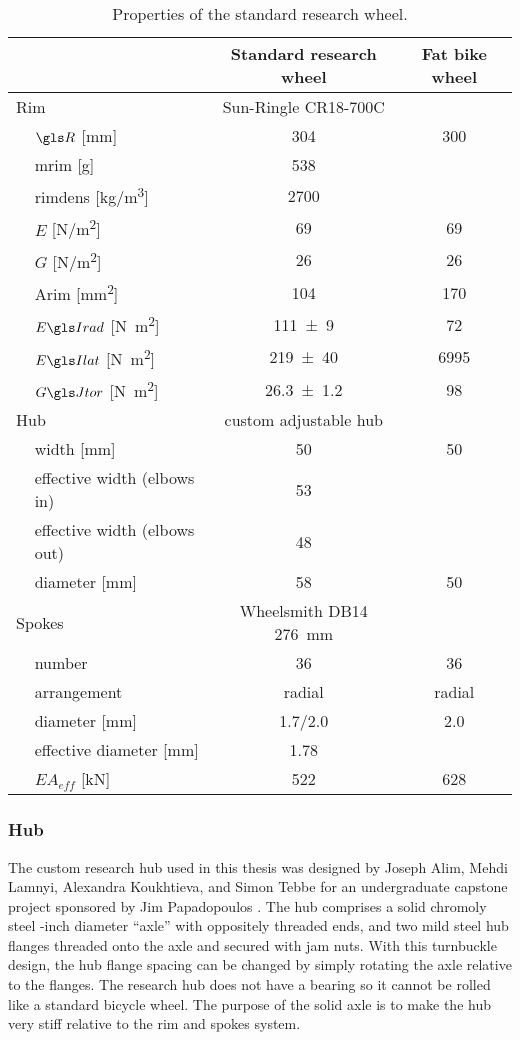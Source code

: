 \documentclass[../../thesis.tex]{subfiles}
\begin{document}
\begin{table}
\caption{Properties of the standard research wheel.}
\label{tab:standard_wheels}
\begin{tabular}{llcc}
\hline
&& \textbf{Standard research wheel} & \textbf{Fat bike wheel}\\
\hline
\multicolumn{2}{l}{Rim}& Sun-Ringle CR18-700C\\
\,& $\R$ [\si{mm}]         & \num{304} & 300\\
\,& \gls{mrim} [\si{g}]    & \num{538}\\
\,& \gls{rimdens} [\si{kg/m^3}] & \num{2700}\\
\,& $E$ [\si{N/m^2}]       & \num{69}        & \num{69}\\
\,& $G$ [\si{N/m^2}]       & \num{26}        & \num{26}\\
\,& \gls{Arim} [\si{mm^2}] & \num{104}       & \num{170}\\
\,& $\EIr$ [\si{N.m^2}]    & \num{111+-9}    & \num{72}\\
\,& $\EIl$ [\si{N.m^2}]    & \num{219+-40}   & \num{6995}\\
\,& $\GJ$   [\si{N.m^2}]   & \num{26.3+-1.2} & \num{98}\\
\multicolumn{2}{l}{Hub} & custom adjustable hub\\
\,& width [\si{mm}]              & 50 & 50\\
\,& effective width (elbows in)  & 53\\
\,& effective width (elbows out) & 48\\
\,& diameter [\si{mm}]           & 58 & 50\\
\multicolumn{2}{l}{Spokes} & Wheelsmith DB14 \SI{276}{mm}\\
\,& number                 & 36      & 36\\
\,& arrangement            & radial  & radial\\
\,& diameter [\si{mm}]     & 1.7/2.0 & 2.0\\
\,& effective diameter [\si{mm}]     & 1.78\\
\,& $EA_{eff}$ [\si{kN}]   & 522     & 628\\
\hline
\end{tabular}
\end{table}

\subsubsection*{Hub}
The custom research hub used in this thesis was designed by Joseph Alim, Mehdi Lamnyi, Alexandra Koukhtieva, and Simon Tebbe for an undergraduate capstone project sponsored by Jim Papadopoulos \cite{Alim2016}. The hub comprises a solid chromoly steel -inch diameter ``axle'' with oppositely threaded ends, and two mild steel hub flanges threaded onto the axle and secured with jam nuts. With this turnbuckle design, the hub flange spacing can be changed by simply rotating the axle relative to the flanges. The research hub does not have a bearing so it cannot be rolled like a standard bicycle wheel. The purpose of the solid axle is to make the hub very stiff relative to the rim and spokes system.
\end{document}
